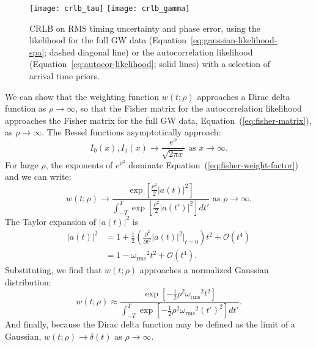 \documentclass[amsmath,amssymb,aps,prx,reprint,nopreprintnumbers,nofootinbib]{revtex4-1}
\begin{document}
\begin{figure}
    \centering
        \texttt{[image: crlb\_tau]}
        \texttt{[image: crlb\_gamma]}
    \caption[\acl{CRLB} on time and phase accuracy]{\label{fig:crlb-tau}\ac{CRLB} on \ac{RMS} timing uncertainty and phase error, using the likelihood for the full \ac{GW} data (Equation~\ref{eq:gaussian-likelihood-spa}; dashed diagonal line) or the autocorrelation likelihood (Equation~\ref{eq:autocor-likelihood}; solid lines) with a selection of arrival time priors.}
\end{figure}

We can show that the weighting function $w(t; \rho)$ approaches a Dirac delta function as $\rho \rightarrow \infty$, so that the Fisher matrix for the autocorrelation likelihood approaches the Fisher matrix for the full \ac{GW} data, Equation~(\ref{eq:fisher-matrix}), as $\rho \rightarrow \infty$. The Bessel functions asymptotically approach:
%
\begin{equation*}
    I_0(x), I_1(x) \rightarrow \frac{e^x}{\sqrt{2 \pi x}}
    \textrm{ as } x \rightarrow \infty.
\end{equation*}
%
For large $\rho$, the exponents of $e^{\rho^2}$ dominate Equation~(\ref{eq:fisher-weight-factor}) and we can write:
%
\begin{equation*}
    w(t; \rho) \rightarrow \frac{
        \displaystyle
        \exp\left[\frac{\rho^2}{2}|a(t)|^2\right]
    }{
        \displaystyle
        \int_{-T}^T \exp\left[\frac{\rho^2}{2}|a(t')|^2\right] dt'
    }
    \textrm{ as } \rho \rightarrow \infty.
\end{equation*}
%
The Taylor expansion of $|a(t)|^2$ is
%
\begin{align}
    \nonumber
    |a(t)|^2 &= 1 + \frac{1}{2} \left(\frac{\partial^2}{\partial t^2}|a(t)|^2 \Bigg|_{t=0}\right) t^2 + \mathcal{O}(t^4) \\
    \nonumber
    &= 1 - {\omega_\mathrm{rms}}^2 t^2 + \mathcal{O}(t^4).
\end{align}
%
Substituting, we find that $w(t; \rho)$ approaches a normalized Gaussian distribution:
%
\begin{equation*}
    w(t; \rho) \approx \frac{
        \displaystyle
        \exp\left[-\frac{1}{2} \rho^2 {\omega_\mathrm{rms}}^2 t^2\right]
    }{
        \displaystyle
        \int_{-T}^T \exp\left[-\frac{1}{2} \rho^2 {\omega_\mathrm{rms}}^2 (t')^2\right] dt'
    }.
\end{equation*}
%
And finally, because the Dirac delta function may be defined as the limit of a Gaussian, $w(t; \rho) \rightarrow \delta(t)$ as $\rho \rightarrow \infty$.
\end{document}
